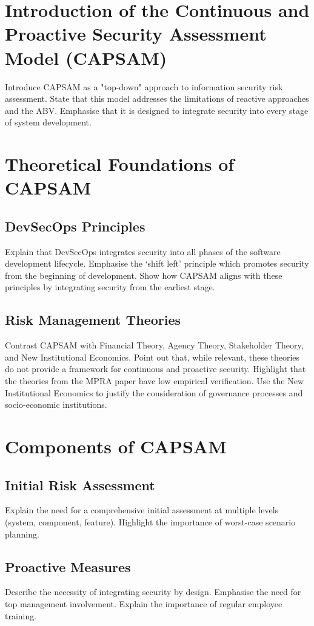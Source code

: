 \section{Introduction of the Continuous and Proactive Security Assessment Model (CAPSAM)}
Introduce CAPSAM as a "top-down" approach to information security risk assessment. State that this model addresses the limitations of reactive approaches and the ABV. Emphasise that it is designed to integrate security into every stage of system development.

\section{Theoretical Foundations of CAPSAM}
\subsection{DevSecOps Principles}
Explain that DevSecOps integrates security into all phases of the software development lifecycle. Emphasise the `shift left' principle which promotes security from the beginning of development. Show how CAPSAM aligns with these principles by integrating security from the earliest stage. \citep{ibm2021devsecops}
\subsection{Risk Management Theories}
Contrast CAPSAM with Financial Theory, Agency Theory, Stakeholder Theory, and New Institutional Economics. Point out that, while relevant, these theories do not provide a framework for continuous and proactive security. Highlight that the theories from the MPRA paper have low empirical verification. Use the New Institutional Economics to justify the consideration of governance processes and socio-economic institutions. \citep{klimczak2007risk}

\section{Components of CAPSAM}
\subsection{Initial Risk Assessment}
Explain the need for a comprehensive initial assessment at multiple levels (system, component, feature). Highlight the importance of worst-case scenario planning.
\subsection{Proactive Measures}
Describe the necessity of integrating security by design. Emphasise the need for top management involvement. Explain the importance of regular employee training.
